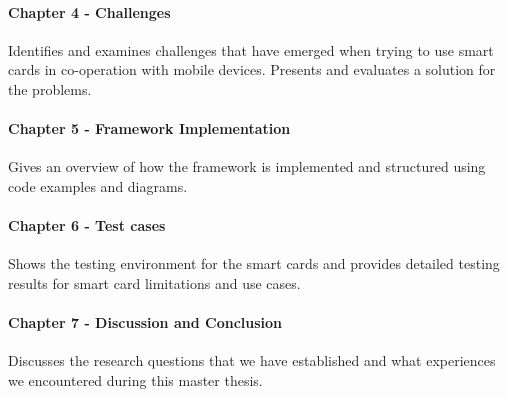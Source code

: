 \paragraph{Chapter 4 - Challenges}
Identifies and examines challenges that have emerged when trying to use smart cards in co-operation with mobile devices. Presents and evaluates a solution for the problems.

\paragraph{Chapter 5 - Framework Implementation}
Gives an overview of how the framework is implemented and structured using code examples and diagrams.

\paragraph{Chapter 6 - Test cases}
Shows the testing environment for the smart cards and provides detailed testing results for smart card limitations and use cases.

\paragraph{Chapter 7 - Discussion and Conclusion}
Discusses the research questions that we have established and what experiences we encountered during this master thesis.
